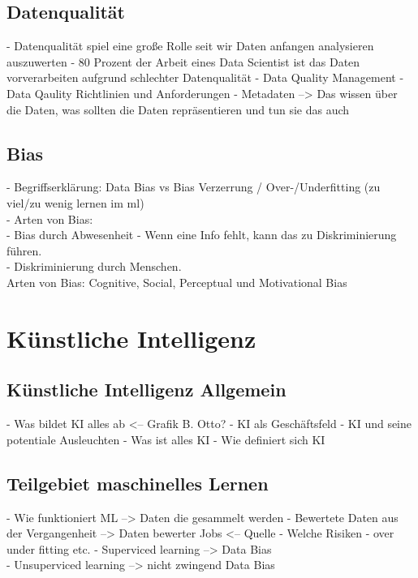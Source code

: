 \begin{onehalfspace}
    \subsection{Datenqualität}
    \label{subsubsec:datenqualität}
        - Datenqualität spiel eine große Rolle seit wir Daten anfangen analysieren auszuwerten
        - 80 Prozent der Arbeit eines Data Scientist ist das Daten vorverarbeiten aufgrund schlechter Datenqualität
        - Data Quality Management
        - Data Qaulity Richtlinien und Anforderungen
        - Metadaten --> Das wissen über die Daten, was sollten die Daten repräsentieren und tun sie das auch

    \subsection{Bias}
    \label{subsubsec:Bias}
        -   Begriffserklärung: Data Bias vs Bias Verzerrung / Over-/Underfitting (zu viel/zu wenig lernen im ml)\\
        -   Arten von Bias: \\
            -   Bias durch Abwesenheit - Wenn eine Info fehlt, kann das zu Diskriminierung führen. \\
            -   Diskriminierung durch Menschen. \\
        Arten von Bias: Cognitive, Social, Perceptual und Motivational Bias \cite{Parkavi2018}


    \newpage
    \section{Künstliche Intelligenz}
    \label{subsec:KIandML}
    \subsection{Künstliche Intelligenz Allgemein}
    \label{subsubsec:KIAllgemein}
        - Was bildet KI alles ab <-- Grafik B. Otto?
        - KI als Geschäftsfeld 
        - KI und seine potentiale Ausleuchten 
        - Was ist alles KI
        - Wie definiert sich KI


    \subsection{Teilgebiet maschinelles Lernen}
    \label{subsubsec:teilgebietML}
        - Wie funktioniert ML --> Daten die gesammelt werden
        - Bewertete Daten aus der Vergangenheit --> Daten bewerter Jobs <-- Quelle
        - Welche Risiken - over under fitting etc.
        -   Superviced learning --> Data Bias\\
        -   Unsuperviced learning --> nicht zwingend Data Bias\\



\end{onehalfspace}
